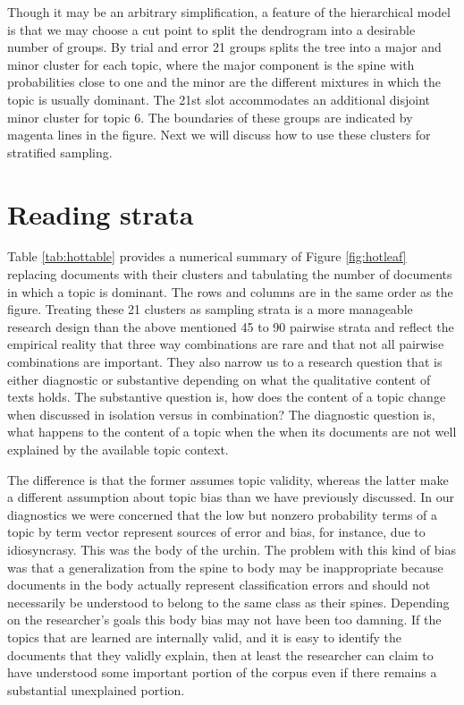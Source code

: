 \documentclass[]{book}
\theoremstyle{definition}
\theoremstyle{definition}
\theoremstyle{definition}
\theoremstyle{remark}
\begin{document}
Though it may be an arbitrary simplification, a feature of the
hierarchical model is that we may choose a cut point to split the
dendrogram into a desirable number of groups. By trial and error 21
groups splits the tree into a major and minor cluster for each topic,
where the major component is the spine with probabilities close to one
and the minor are the different mixtures in which the topic is usually
dominant. The 21st slot accommodates an additional disjoint minor
cluster for topic 6. The boundaries of these groups are indicated by
magenta lines in the figure. Next we will discuss how to use these
clusters for stratified sampling.

\hypertarget{reading-strata}{%
\section{Reading strata}\label{reading-strata}}

Table \ref{tab:hottable} provides a numerical summary of Figure
\ref{fig:hotleaf} replacing documents with their clusters and tabulating
the number of documents in which a topic is dominant. The rows and
columns are in the same order as the figure. Treating these 21 clusters
as sampling strata is a more manageable research design than the above
mentioned 45 to 90 pairwise strata and reflect the empirical reality
that three way combinations are rare and that not all pairwise
combinations are important. They also narrow us to a research question
that is either diagnostic or substantive depending on what the
qualitative content of texts holds. The substantive question is, how
does the content of a topic change when discussed in isolation versus in
combination? The diagnostic question is, what happens to the content of
a topic when the when its documents are not well explained by the
available topic context.

The difference is that the former assumes topic validity, whereas the
latter make a different assumption about topic bias than we have
previously discussed. In our diagnostics we were concerned that the low
but nonzero probability terms of a topic by term vector represent
sources of error and bias, for instance, due to idiosyncrasy. This was
the body of the urchin. The problem with this kind of bias was that a
generalization from the spine to body may be inappropriate because
documents in the body actually represent classification errors and
should not necessarily be understood to belong to the same class as
their spines. Depending on the researcher's goals this body bias may not
have been too damning. If the topics that are learned are internally
valid, and it is easy to identify the documents that they validly
explain, then at least the researcher can claim to have understood some
important portion of the corpus even if there remains a substantial
unexplained portion.
\end{document}
